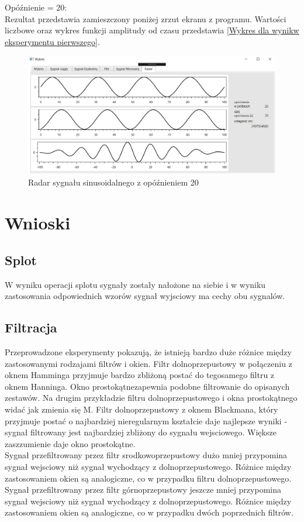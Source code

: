 \documentclass[12pt]{article}
\begin{document}
Opóźnienie = 20:
\\Rezultat przedstawia zamieszczony poniżej zrzut ekranu z programu. Wartości liczbowe oraz wykres funkcji amplitudy od czasu przedstawia \ref{Wykres dla wynikw eksperymentu pierwszego}.
\begin{figure}[h!]
 \centering
 \includegraphics[width=12.3cm]{sin1R20.PNG}
 \vspace{-0.3cm}
 \caption{Radar sygnału sinusoidalnego z opóźnieniem 20}
 \label{r20}
\end{figure}


\section{Wnioski}
\subsection{Splot}
W wyniku operacji splotu sygnały zostały nałożone na siebie i w wyniku zastosowania odpowiednich wzorów sygnał wyjsciowy ma cechy obu sygnalów.
\subsection{Filtracja}
Przeprowadzone eksperymenty pokazują, że istnieją bardzo duże różnice między zastosowanymi rodzajami filtrów i okien.
Filtr dolnoprzepustowy w połączeniu z oknem Hamminga przyjmuje bardzo zbliżoną postać do tegosamego filtru z oknem Hanninga. Okno prostokątnezapewnia podobne filtrowanie do opisanych zestawów.  Na drugim przykładzie filtru dolnoprzepustowego i okna prostokątnego widać jak zmienia się M.
Filtr dolnoprzepustowy z oknem Blackmana, który przyjmuje postać o najbardziej nieregularnym kształcie daje najlepsze wyniki -  sygnał filtrowany jest najbardziej zbliżony do sygnału wejsciowego. Większe zaszzumienie daje okno prostokątne.
\\Sygnał przefiltrowany przez filtr srodkowoprzepustowy dużo mniej przypomina sygnał wejsciowy niż sygnał wychodzący z dolnoprzepustowego. Różnice między zastosowaniem okien są analogiczne, co w przypadku filtru dolnoprzepustowego.
\\Sygnał przefiltrowany przez filtr górnoprzepustowy jeszcze mniej przypomina sygnał wejsciowy niż sygnał wychodzący z dolnoprzepustowego. Różnice między zastosowaniem okien są analogiczne, co w przypadku dwóch poprzednich filtrów.
 
\end{document}

